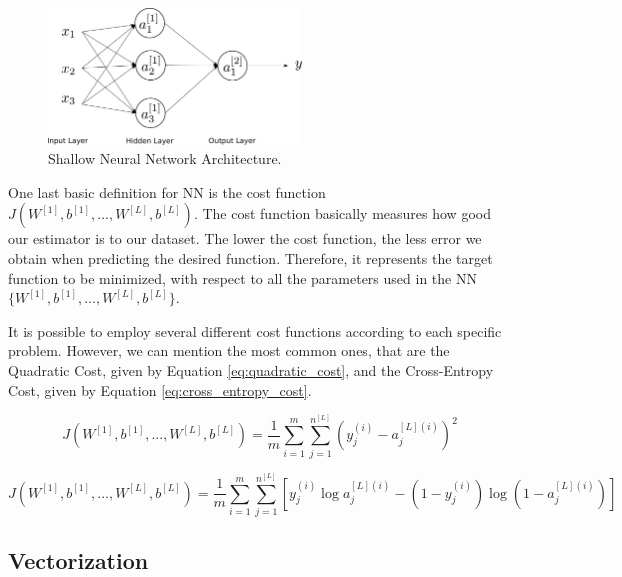 \begin{figure}[H]
    \centering
    \includegraphics[width=0.6\textwidth]{Chapter4/neuralnet.pdf}
    \caption{Shallow Neural Network Architecture.}
    \label{fig:nn_basic_architecture}
\end{figure}

One last basic definition for NN is the cost function $J(W^{[1]},b^{[1]},...,W^{[L]},b^{[L]})$. The cost function basically measures how good our estimator is to our dataset. The lower the cost function, the less error we obtain when predicting the desired function. Therefore, it represents the target function to be minimized, with respect to all the parameters used in the NN $\{ W^{[1]},b^{[1]},...,W^{[L]},b^{[L]} \}$.

It is possible to employ several different cost functions according to each specific problem. However, we can mention the most common ones, that are the Quadratic Cost, given by Equation \eqref{eq:quadratic_cost}, and the Cross-Entropy Cost, given by Equation \eqref{eq:cross_entropy_cost}.

\begin{equation}
J(W^{[1]},b^{[1]},...,W^{[L]},b^{[L]}) = \frac{1}{m} \sum_{i=1}^{m}{\sum_{j=1}^{n^{[L]}}{ (y_j^{(i)} - a_j^{[L](i)})^2 }}
\label{eq:quadratic_cost}
\end{equation}

\begin{equation}
J(W^{[1]},b^{[1]},...,W^{[L]},b^{[L]}) = \frac{1}{m} \sum_{i=1}^{m}{\sum_{j=1}^{n^{[L]}}{ \left[ y_j^{(i)}\log{a_j^{[L](i)}} - (1-y_j^{(i)}) \log{ (1 - a_j^{[L](i)}) } \right] }}
\label{eq:cross_entropy_cost}
\end{equation}


\subsection{Vectorization}


